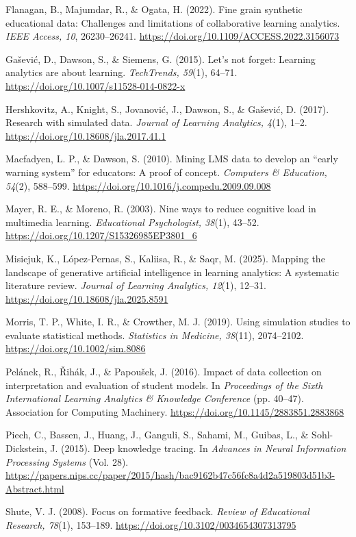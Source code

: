 \documentclass[11pt]{article}
\begin{document}
\begin{references}
\item Flanagan, B., Majumdar, R., \& Ogata, H. (2022). Fine grain synthetic educational data: Challenges and limitations of collaborative learning analytics. \textit{IEEE Access, 10}, 26230–26241. \url{https://doi.org/10.1109/ACCESS.2022.3156073}
\item Gašević, D., Dawson, S., \& Siemens, G. (2015). Let’s not forget: Learning analytics are about learning. \textit{TechTrends, 59}(1), 64–71. \url{https://doi.org/10.1007/s11528-014-0822-x}
\item Hershkovitz, A., Knight, S., Jovanović, J., Dawson, S., \& Gašević, D. (2017). Research with simulated data. \textit{Journal of Learning Analytics, 4}(1), 1–2. \url{https://doi.org/10.18608/jla.2017.41.1}
\item Macfadyen, L. P., \& Dawson, S. (2010). Mining LMS data to develop an “early warning system” for educators: A proof of concept. \textit{Computers \& Education, 54}(2), 588–599. \url{https://doi.org/10.1016/j.compedu.2009.09.008}
\item Mayer, R. E., \& Moreno, R. (2003). Nine ways to reduce cognitive load in multimedia learning. \textit{Educational Psychologist, 38}(1), 43–52. \url{https://doi.org/10.1207/S15326985EP3801_6}
\item Misiejuk, K., López-Pernas, S., Kaliisa, R., \& Saqr, M. (2025). Mapping the landscape of generative artificial intelligence in learning analytics: A systematic literature review. \textit{Journal of Learning Analytics, 12}(1), 12–31. \url{https://doi.org/10.18608/jla.2025.8591}
\item Morris, T. P., White, I. R., \& Crowther, M. J. (2019). Using simulation studies to evaluate statistical methods. \textit{Statistics in Medicine, 38}(11), 2074–2102. \url{https://doi.org/10.1002/sim.8086}
\item Pelánek, R., Řihák, J., \& Papoušek, J. (2016). Impact of data collection on interpretation and evaluation of student models. In \textit{Proceedings of the Sixth International Learning Analytics \& Knowledge Conference} (pp. 40–47). Association for Computing Machinery. \url{https://doi.org/10.1145/2883851.2883868}
\item Piech, C., Bassen, J., Huang, J., Ganguli, S., Sahami, M., Guibas, L., \& Sohl-Dickstein, J. (2015). Deep knowledge tracing. In \textit{Advances in Neural Information Processing Systems} (Vol. 28). \url{https://papers.nips.cc/paper/2015/hash/bac9162b47c56fc8a4d2a519803d51b3-Abstract.html}
\item Shute, V. J. (2008). Focus on formative feedback. \textit{Review of Educational Research, 78}(1), 153–189. \url{https://doi.org/10.3102/0034654307313795}

\end{references}
\end{document}
